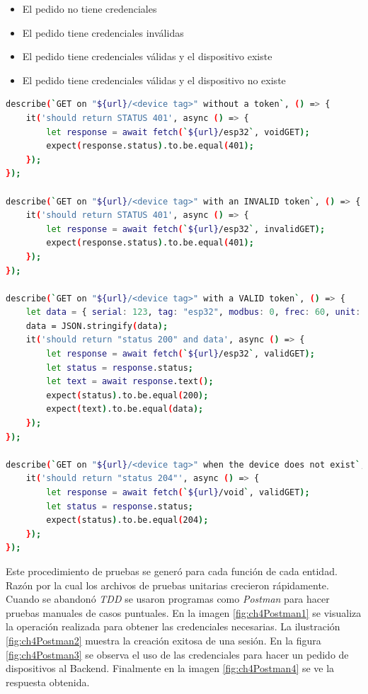 \begin{itemize}
	\item El pedido no tiene credenciales
	\item El pedido tiene credenciales inválidas
	\item El pedido tiene credenciales válidas y el dispositivo existe
	\item El pedido tiene credenciales válidas y el dispositivo no existe
\end{itemize}

\begin{lstlisting}[language=bash,label=cod:ch3BackendUnitTest,caption=Extracto de prueba unitaria Backend.]
describe(`GET on "${url}/<device tag>" without a token`, () => {
    it('should return STATUS 401', async () => {
        let response = await fetch(`${url}/esp32`, voidGET);
        expect(response.status).to.be.equal(401);
    });
});

describe(`GET on "${url}/<device tag>" with an INVALID token`, () => {
    it('should return STATUS 401', async () => {
        let response = await fetch(`${url}/esp32`, invalidGET);
        expect(response.status).to.be.equal(401);
    });
});

describe(`GET on "${url}/<device tag>" with a VALID token`, () => {
    let data = { serial: 123, tag: "esp32", modbus: 0, frec: 60, unit: "t" };
    data = JSON.stringify(data);
    it('should return "status 200" and data', async () => {
        let response = await fetch(`${url}/esp32`, validGET);
        let status = response.status;
        let text = await response.text();
        expect(status).to.be.equal(200);
        expect(text).to.be.equal(data);
    });
});

describe(`GET on "${url}/<device tag>" when the device does not exist`, () => {
    it('should return "status 204"', async () => {
        let response = await fetch(`${url}/void`, validGET);
        let status = response.status;
        expect(status).to.be.equal(204);
    });
});
\end{lstlisting}

Este procedimiento de pruebas se generó para cada función de cada entidad.
Razón por la cual los archivos de pruebas unitarias crecieron rápidamente.
Cuando se abandonó \emph{TDD} se usaron programas como \emph{Postman} para hacer pruebas manuales de casos puntuales.
En la imagen \ref{fig:ch4Postman1} se visualiza la operación realizada para obtener las credenciales necesarias.
La ilustración \ref{fig:ch4Postman2} muestra la creación exitosa de una sesión.
En la figura \ref{fig:ch4Postman3} se observa el uso de las credenciales para hacer un pedido de dispositivos al Backend.
Finalmente en la imagen \ref{fig:ch4Postman4} se ve la respuesta obtenida. 


